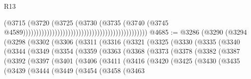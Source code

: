 \begin{lexlean}{R13}
\begin{coremodule}
                                                                                    (@3715
                                                                                      (@3720
                                                                                        (@3725
                                                                                          (@3730
                                                                                            (@3735
                                                                                              (@3740
                                                                                                (@3745
                                                                                                  @4589)))))))))))))))))))))))))))))))))))))))))))))))
@4685 := @3286
    (@3290
      (@3294
        (@3298
          (@3302
            (@3306
              (@3311
                (@3316
                  (@3321
                    (@3325
                      (@3330
                        (@3335
                          (@3340
                            (@3344
                              (@3349
                                (@3354
                                  (@3359
                                    (@3363
                                      (@3368
                                        (@3373
                                          (@3378
                                            (@3382
                                              (@3387
                                                (@3392
                                                  (@3397
                                                    (@3401
                                                      (@3406
                                                        (@3411
                                                          (@3416
                                                            (@3420
                                                              (@3425
                                                                (@3430
                                                                  (@3435
                                                                    (@3439
                                                                      (@3444
                                                                        (@3449
                                                                          (@3454
                                                                            (@3458
                                                                              (@3463

\end{coremodule}
\end{lexlean}
